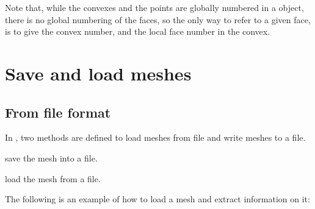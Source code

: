 \documentclass[a4paper,11pt,english]{sphinxmanual}
\begin{document}
Note that, while the convexes and the points are globally numbered in a 
object, there is no global numbering of the faces, so the only way to refer to
a given face, is to give the convex number, and the local face number in the
convex.


\section{Save and load meshes}
\label{\detokenize{userdoc/bmesh:save-and-load-meshes}}\label{\detokenize{userdoc/bmesh:ud-load-save-mesh}}

\subsection{From  file format}
\label{\detokenize{userdoc/bmesh:from-gf-file-format}}
In , two methods are defined to load meshes from file
and write meshes to a file.

\begin{fulllineitems}
\label{\detokenize{userdoc/bmesh:_CPPv4N6getfem4mesh13write_to_fileERKNSt6stringE}}%
\pysigstartmultiline
{}%
\pysigstopmultiline
save the mesh into a file.

\end{fulllineitems}


\begin{fulllineitems}
\label{\detokenize{userdoc/bmesh:_CPPv4N6getfem4mesh14read_from_fileERKNSt6stringE}}%
\pysigstartmultiline
{}%
\pysigstopmultiline
load the mesh from a file.

\end{fulllineitems}


The following is an example of how to load a mesh and extract information on it:
\end{document}

